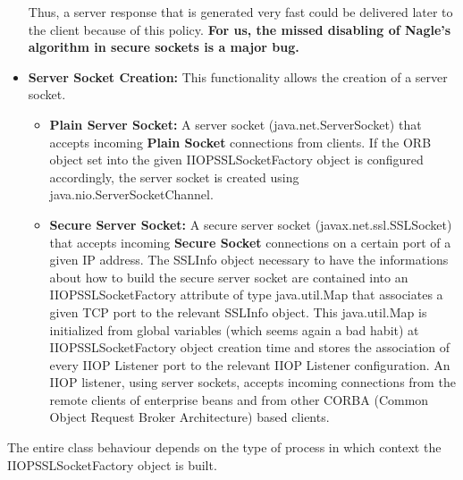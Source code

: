 \begin{itemize}
		Thus, a server response that is generated very fast could be delivered later to the client because of this policy.
		\textbf{For us, the missed disabling of Nagle's algorithm in secure sockets is a major bug.}
	\item \textbf{Server Socket Creation:}
		This functionality allows the creation of a server socket.
		\begin{itemize}
			\item \textbf{Plain Server Socket:}
				A server socket (java.net.ServerSocket) that accepts incoming \textbf{Plain Socket} connections from clients. If the ORB object set into the given IIOPSSLSocketFactory object is configured accordingly, the server socket is created using java.nio.ServerSocketChannel.
			\item \textbf{Secure Server Socket:}
				A secure server socket (javax.net.ssl.SSLSocket) that accepts incoming \textbf{Secure Socket} connections on a certain port of a given IP address.
				The SSLInfo object necessary to have the informations about how to build the secure server socket are contained into an IIOPSSLSocketFactory attribute of type java.util.Map that associates a given TCP port to the relevant SSLInfo object.
				This java.util.Map is initialized from global variables (which seems again a bad habit) at IIOPSSLSocketFactory object creation time and stores the association of every IIOP Listener port to the relevant IIOP Listener configuration.
				An IIOP listener, using server sockets, accepts incoming connections from the remote clients of enterprise beans and from other CORBA (Common Object Request Broker Architecture) based clients.
		\end{itemize}
\end{itemize}



The entire class behaviour depends on the type of process in which context the IIOPSSLSocketFactory object is built.











